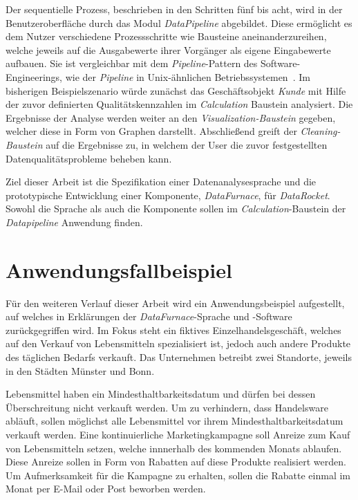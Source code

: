 \documentclass[
  language=german, %
  type=bachelor%
]{isthesis}
\begin{document}
\begin{content}
	Der sequentielle Prozess, beschrieben in den Schritten fünf bis acht, wird in der
	Benutzeroberfläche durch das Modul \textit{DataPipeline}
	abgebildet. Diese ermöglicht es dem
	Nutzer verschiedene Prozessschritte wie Bausteine aneinanderzureihen,
	welche jeweils auf die Ausgabewerte ihrer Vorgänger als eigene Eingabewerte
	aufbauen. Sie ist vergleichbar mit dem \textit{Pipeline}-Pattern des
	Software-Engineerings, wie \zB{} der \textit{Pipeline} in Unix-ähnlichen
	Betriebssystemen~\cite[][]{spinellis2001notable}. Im bisherigen
	Beispielszenario würde zunächst das Geschäftsobjekt \textit{Kunde} mit Hilfe
	der zuvor definierten Qualitätskennzahlen im \textit{Calculation} Baustein
	analysiert. Die Ergebnisse der Analyse werden weiter an den
	\textit{Visualization-Baustein} gegeben, welcher diese in Form von Graphen
	darstellt. Abschließend greift der \textit{Cleaning-Baustein} auf die
	Ergebnisse zu, in welchem der User die zuvor festgestellten
	Datenqualitätsprobleme beheben kann.

	Ziel dieser Arbeit ist die Spezifikation einer Datenanalysesprache und die
	prototypische Entwicklung einer Komponente, \textit{DataFurnace}, für
	\textit{DataRocket}. Sowohl die Sprache als auch die Komponente sollen im
	\textit{Calculation}-Baustein der \textit{Datapipeline} Anwendung finden.

  \section{Anwendungsfallbeispiel}\label{sec:anwendungsfallbeispiel}

  Für den weiteren Verlauf dieser Arbeit wird ein Anwendungsbeispiel
  aufgestellt, auf welches in Erklärungen der \textit{DataFurnace}-Sprache und
  -Software zurückgegriffen wird. Im Fokus steht ein fiktives
  Einzelhandelsgeschäft, welches auf den Verkauf von Lebensmitteln
  spezialisiert ist, jedoch auch andere Produkte des täglichen Bedarfs
  verkauft. Das Unternehmen betreibt zwei Standorte, jeweils in den Städten
  Münster und Bonn.

  Lebensmittel haben ein Mindesthaltbarkeitsdatum und dürfen bei dessen
  Überschreitung nicht verkauft werden. Um zu verhindern, dass Handelsware
  abläuft, sollen möglichst alle Lebensmittel vor ihrem
  Mindesthaltbarkeitsdatum verkauft werden. Eine kontinuierliche
  Marketingkampagne soll Anreize zum Kauf von Lebensmitteln setzen, welche
  innnerhalb des kommenden Monats ablaufen. Diese Anreize sollen in Form von
  Rabatten auf diese Produkte realisiert werden. Um Aufmerksamkeit für die
  Kampagne zu erhalten, sollen die Rabatte einmal im Monat per E-Mail oder Post
  beworben werden. 


\end{content}
\end{document}
